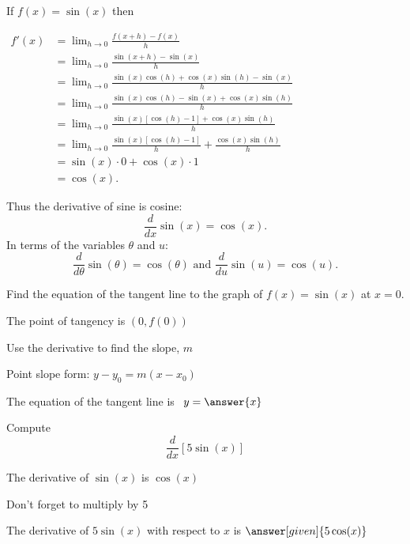 \documentclass{ximera}
\begin{document}
\begin{explanation} %
If $f(x) = \sin(x)$ then
\begin{center}
$\begin{aligned}
f'(x) &= \lim_{h \to 0} \frac{f(x+h)-f(x)}{h} \\[5pt]
&= \lim_{h \to 0} \frac{\sin(x+h) - \sin(x)}{h}\\[5pt]
&=  \lim_{h \to 0} \frac{\sin(x)\cos(h) + \cos(x)\sin(h) - \sin(x)}{h}\\[5pt]
&=  \lim_{h \to 0} \frac{\sin(x)\cos(h)  - \sin(x) + \cos(x)\sin(h)}{h}\\[5pt]
&=  \lim_{h \to 0} \frac{\sin(x)[\cos(h) -1] + \cos(x)\sin(h)}{h}\\[5pt]
&=  \lim_{h \to 0} \frac{\sin(x)[\cos(h) -1]}{h} + \frac{\cos(x)\sin(h)}{h}\\[5pt]
&=  \sin(x) \cdot 0 + \cos(x) \cdot 1 \\[5pt]
&= \cos(x).
\end{aligned}$
\end{center}
Thus the derivative of sine is cosine:
\[
\frac{d}{dx}\sin(x) = \cos(x).
\]
In terms of the variables $\theta$ and $u$:
\[
\frac{d}{d\theta}\sin(\theta) = \cos(\theta) \text{  and  } \frac{d}{du}\sin(u) = \cos(u).
\]
\end{explanation}



\begin{problem} %

Find the equation of the tangent line to the graph of $f(x) = \sin(x)$ at $x=0.$

\begin{hint}
The point of tangency is $(0, f(0))$
\end{hint}
\begin{hint}
Use the derivative to find the slope, $m$
\end{hint}
\begin{hint}
Point slope form: $y-y_0 = m(x-x_0)$
\end{hint}

The equation of the tangent line is \ $y = \answer{x}$

\end{problem}





\begin{problem} %
  
Compute 
\[
\frac{d}{dx} \left[5\sin(x)\right]
\]
  
\begin{hint}
The derivative of $\sin(x)$ is $\cos(x)$
\end{hint}
\begin{hint}
Don't forget to multiply by 5
\end{hint}
		
The derivative of $5\sin(x)$ with respect to $x$ is
$\answer[given]{5\cos(x)}$

\end{problem}
\end{document}
